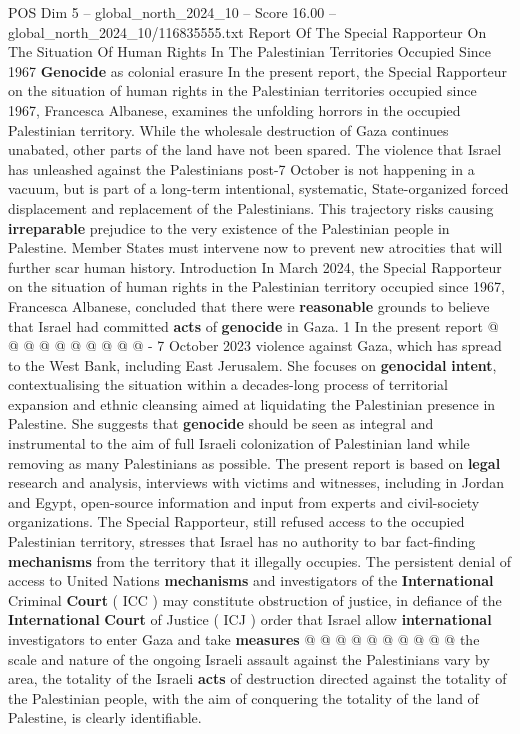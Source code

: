 \begin{textsample}{POS Dim 5 – global\_north\_2024\_10 – Score 16.00 – global\_north\_2024\_10/116835555.txt}  \label{ex:f5_pos_401}
Report Of The Special Rapporteur On The Situation Of Human Rights In The Palestinian Territories Occupied Since 1967 \textbf{Genocide} as colonial erasure In the present report, the Special Rapporteur on the situation of human rights in the Palestinian territories occupied since 1967, Francesca Albanese, examines the unfolding horrors in the occupied Palestinian territory.
While the wholesale destruction of Gaza continues unabated, other parts of the land have not been spared.
The violence that Israel has unleashed against the Palestinians post-7 October is not happening in a vacuum, but is part of a long-term intentional, systematic, State-organized forced displacement and replacement of the Palestinians.
This trajectory risks causing \textbf{irreparable} prejudice to the very existence of the Palestinian people in Palestine.
Member States must intervene now to prevent new atrocities that will further scar human history.
Introduction In March 2024, the Special Rapporteur on the situation of human rights in the Palestinian territory occupied since 1967, Francesca Albanese, concluded that there were \textbf{reasonable} grounds to believe that Israel had committed \textbf{acts} of \textbf{genocide} in Gaza. 1 In the present report @ @ @ @ @ @ @ @ @ @ - 7 October 2023 violence against Gaza, which has spread to the West Bank, including East Jerusalem.
She focuses on \textbf{genocidal} \textbf{intent}, contextualising the situation within a decades-long process of territorial expansion and ethnic cleansing aimed at liquidating the Palestinian presence in Palestine.
She suggests that \textbf{genocide} should be seen as integral and instrumental to the aim of full Israeli colonization of Palestinian land while removing as many Palestinians as possible.
The present report is based on \textbf{legal} research and analysis, interviews with victims and witnesses, including in Jordan and Egypt, open-source information and input from experts and civil-society organizations.
The Special Rapporteur, still refused access to the occupied Palestinian territory, stresses that Israel has no authority to bar fact-finding \textbf{mechanisms} from the territory that it illegally occupies.
The persistent denial of access to United Nations \textbf{mechanisms} and investigators of the \textbf{International} Criminal \textbf{Court} ( ICC ) may constitute obstruction of justice, in defiance of the \textbf{International} \textbf{Court} of Justice ( ICJ ) order that Israel allow \textbf{international} investigators to enter Gaza and take \textbf{measures} @ @ @ @ @ @ @ @ @ @ the scale and nature of the ongoing Israeli assault against the Palestinians vary by area, the totality of the Israeli \textbf{acts} of destruction directed against the totality of the Palestinian people, with the aim of conquering the totality of the land of Palestine, is clearly identifiable.

\end{textsample}

